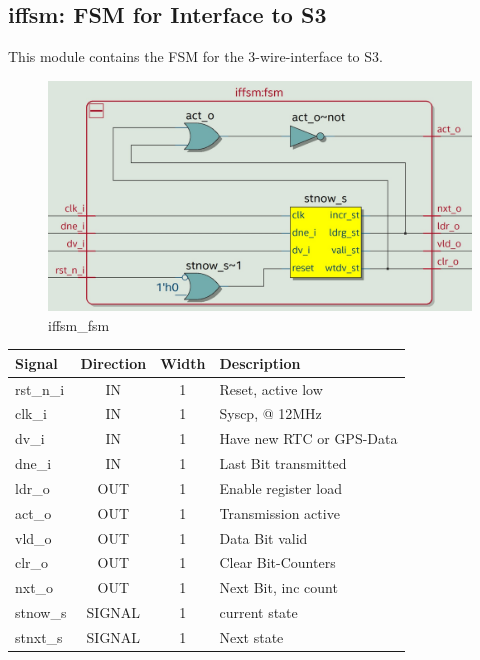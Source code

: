 \documentclass[12pt,a4 paper] {report}
\begin{document}
\subsection{iffsm: FSM for Interface to S3}
This module contains the FSM for the 3-wire-interface to S3.
\begin{figure}[h]
	\centering	
	\includegraphics[scale=0.2]{../png/iffsm_fsm.png}
	\caption{iffsm\_fsm}
\end{figure}
\begin{center}
	\begin{tabular}{ | p{2cm} | c | c | p{5cm} |}
		\hline
		\textbf{Signal} & \textbf{Direction} & \textbf{Width} & \textbf{Description} \\
		\hline
		rst\_n\_i & IN & 1 & Reset, active low \\
		\hline
		clk\_i & IN & 1 & Syscp, @ 12MHz \\
		\hline
		dv\_i & IN & 1 & Have new RTC or GPS-Data \\
		\hline
		dne\_i & IN & 1 & Last Bit transmitted \\
		\hline
		ldr\_o & OUT & 1 & Enable register load \\
		\hline
		act\_o & OUT & 1 & Transmission active \\
		\hline
		vld\_o & OUT & 1 & Data Bit valid \\
		\hline
		clr\_o & OUT & 1 & Clear Bit-Counters \\
		\hline
		nxt\_o & OUT & 1 & Next Bit, inc count \\
		\hline
		\hline
		stnow\_s & SIGNAL & 1 & current state\\
		\hline	
		stnxt\_s & SIGNAL & 1 & Next state\\
		\hline
	\end{tabular}
\end{center}
\end{document}
